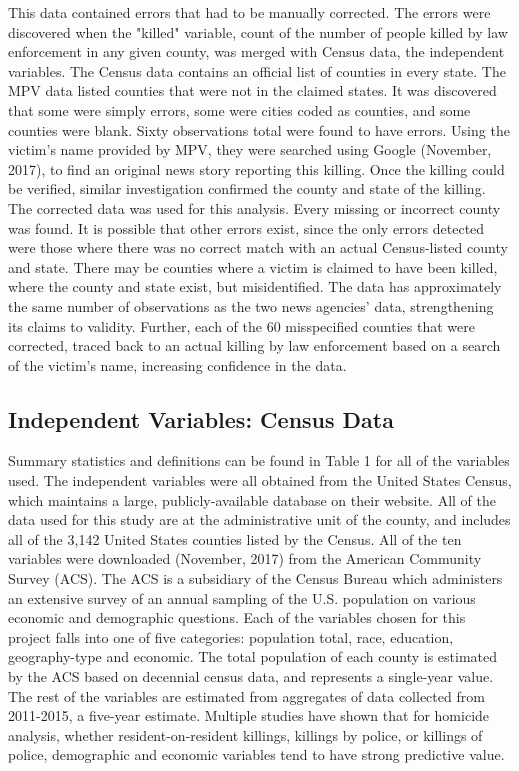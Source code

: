 \documentclass[sigconf]{acmart}
\begin{document}
This data contained errors that had to be manually corrected.  The errors were discovered when the "killed" variable, count of the number of people killed by law enforcement in any given county, was merged with Census data, the independent variables.  The Census data contains an official list of counties in every state. The MPV data listed counties that were not in the claimed states.  It was discovered that some were simply errors, some were cities coded as counties, and some counties were blank.  Sixty observations total were found to have errors.  Using the victim's name provided by MPV, they were searched using Google (November, 2017), to find an original news story reporting this killing.  Once the killing could be verified, similar investigation confirmed the county and state of the killing.  The corrected data was used for this analysis.  Every missing or incorrect county was found.  It is possible that other errors exist, since the only errors detected were those where there was no correct match with an actual Census-listed county and state.  There may be counties where a victim is claimed to have been killed, where the county and state exist, but misidentified.  The data has approximately the same number of observations as the two news agencies' data, strengthening its claims to validity.  Further, each of the 60 misspecified counties that were corrected, traced back to an actual killing by law enforcement based on a search of the victim's name, increasing confidence in the data.

\subsection{Independent Variables: Census Data}
Summary statistics and definitions can be found in Table 1 for all of the variables used.  The independent variables were all obtained from the United States Census, which maintains a large, publicly-available database on their website. \cite{census}  All of the data used for this study are at the administrative unit of the county, and includes all of the 3,142 United States counties listed by the Census.  All of the ten variables were downloaded (November, 2017) from the American Community Survey (ACS). The ACS is a subsidiary of the Census Bureau which administers an extensive survey of an annual sampling of the U.S. population on various economic and demographic questions.  Each of the variables chosen for this project falls into one of five categories: population total, race, education, geography-type and economic.  The total population of each county is estimated by the ACS based on decennial census data, and represents a single-year value.  The rest of the variables are estimated from aggregates of data collected from 2011-2015, a five-year estimate.  Multiple studies have shown that for homicide analysis, whether resident-on-resident killings, killings by police, or killings of police, demographic and economic variables tend to have strong predictive value. \cite{pridemore05,kaminski05,legewie15,patterson16,smith14}
\end{document}
